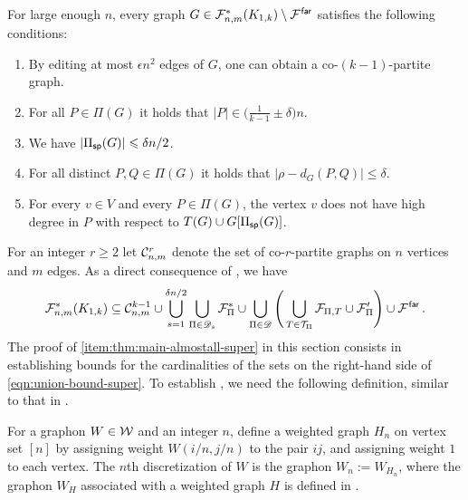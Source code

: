 \begin{lemma}\label{lemma:SuperCloseStructureK1k}
For large enough $n$, every graph $G\in{\mathcal F}^\ast_{n,m}(K_{1,k})\setminus{\mathcal F}^{\hspace{0.2mm}\mathsf{far}}$ satisfies the following conditions:
\begin{enumerate}[
  label=\textit{(\roman*)},
  ref=(\textit{\roman*}),
  topsep=5pt
]
    \item\label{item:lemSuperK1ki} By editing at most $\epsilon n^2$ edges of $G$, one can obtain a co-$(k-1)$-partite graph.
    \item\label{item:lemSuperK1kii} For all $P\in\Pi(G)$ it holds that $|P|\in\big(\frac{1}{k-1}\pm\delta\big)n$.
    \item\label{item:lemSuperK1kiii} We have $|\Pi_{\mathsf{sp}}(G)|\leqslant\delta n/2$.
    \item\label{item:lemSuperK1kiv} For all distinct $P,Q\in\Pi(G)$ it holds that $|\rho-d_G(P,Q)|\leq\delta$.
    \item\label{item:lemSuperK1kv} For every $v\in V$ and every $P\in\Pi(G)$, the vertex $v$ does not have high degree in $P$ with respect to $T(G)\cup G[\Pi_{\mathsf{sp}}(G)]$.
\end{enumerate}
\end{lemma}

For an integer $r\geq2$ let ${\mathcal C}^r_{n,m}$ denote the set of co-$r$-partite graphs on $n$ vertices and $m$ edges. As a direct consequence of , we have
\begin{equation}\label{eqn:union-bound-super}
{\mathcal F}^\ast_{n,m}(K_{1,k})\subseteq{\mathcal C}^{k-1}_{n,m}\cup\bigcup_{s=1}^{\delta n/2}\bigcup_{\Pi\in{\mathscr D}_s}{\mathcal F}^\ast_\Pi\cup\bigcup_{\Pi\in{\mathscr D}}\Bigg(\bigcup_{T\in{\mathcal T}_\Pi}{\mathcal F}_{\Pi,T}\cup{\mathcal F}'_\Pi\Bigg)\cup{\mathcal F}^{\hspace{0.2mm}\mathsf{far}}\,.
\end{equation}
The proof of  \ref{item:thm:main-almostall-super} in this section consists in establishing bounds for the cardinalities of the sets on the right-hand side of \eqref{eqn:union-bound-super}. To establish , we need the following definition, similar to that in \cite{perkins2025typical}.

\begin{definition}\label{def:DiscreteGraphon}
For a graphon $W\in{\mathcal W}$ and an integer $n$, define a weighted graph $H_n$ on vertex set $[n]$ by assigning weight $W(i/n,j/n)$ to the pair $ij$, and assigning weight $1$ to each vertex. The $n$th discretization of $W$ is the graphon $W_n:=W_{H_n}$, where the graphon $W_H$ associated with a weighted graph $H$ is defined in .
\end{definition}

